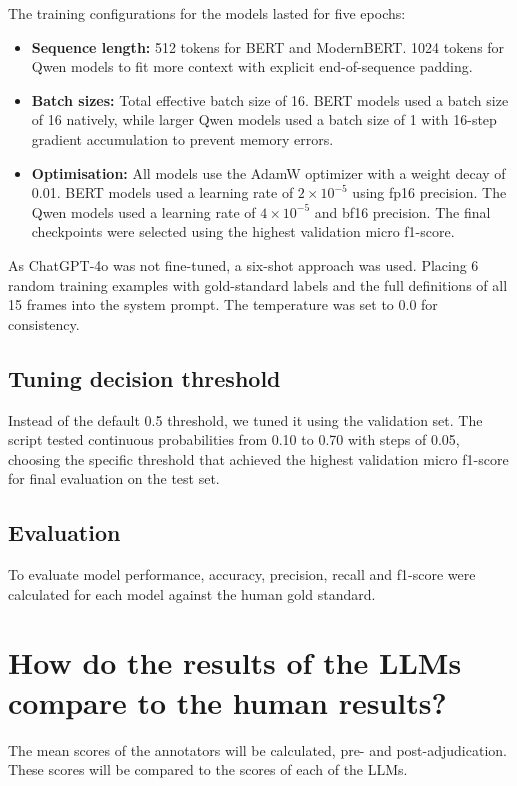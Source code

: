 \documentclass[
10pt, %
a4paper, %
oneside, %
headinclude,footinclude, %
] {book}%
\begin{document}
The training configurations for the models lasted for five epochs:
\begin{itemize}
    \item \textbf{Sequence length:} 512 tokens for BERT and ModernBERT. 1024 tokens for Qwen models to fit more context with explicit end-of-sequence padding.
    \item \textbf{Batch sizes:} Total effective batch size of 16. BERT models used a batch size of 16 natively, while larger Qwen models used a batch size of 1 with 16-step gradient accumulation to prevent memory errors.
    \item \textbf{Optimisation:} All models use the AdamW optimizer with a weight decay of 0.01. BERT models used a learning rate of $2 \times 10^{-5}$ using fp16 precision. The Qwen models used a learning rate of $4 \times 10^{-5}$ and bf16 precision. The final checkpoints were selected using the highest validation micro f1-score.
\end{itemize}

As ChatGPT-4o was not fine-tuned, a six-shot approach was used. Placing 6 random training examples with gold-standard labels and the full definitions of all 15 frames into the system prompt. The temperature was set to 0.0 for consistency.

\subsection{Tuning decision threshold}
Instead of the default 0.5 threshold, we tuned it using the validation set. The script tested continuous probabilities from 0.10 to 0.70 with steps of 0.05, choosing the specific threshold that achieved the highest validation micro f1-score for final evaluation on the test set.


\subsection{Evaluation}
To evaluate model performance, accuracy, precision, recall and f1-score were calculated for each model against the human gold standard.


\section{How do the results of the LLMs compare to the human results?}
The mean scores of the annotators will be calculated, pre- and post-adjudication. These scores will be compared to the scores of each of the LLMs. 
 
\end{document}
